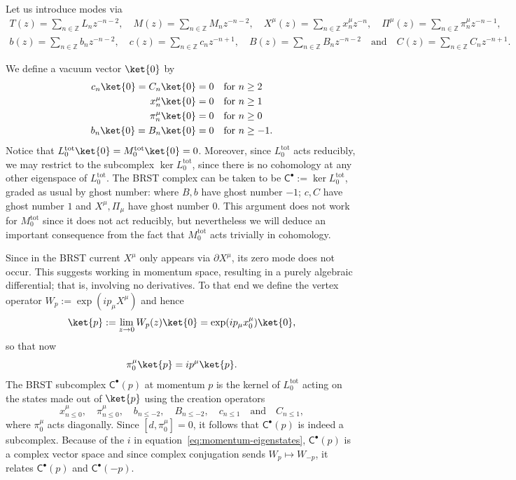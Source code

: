 \documentclass[11pt,reqno,a4paper,final]{amsart}
\theoremstyle{plain}
\theoremstyle{definition}
\renewcommand{\d}{\partial}
\newcommand{\sC}{\mathsf{C}}
\newcommand{\Ltot}{L^{\text{tot}}}
\newcommand{\Mtot}{M^{\text{tot}}}
\newcommand{\vac}{\ket{p}}
\newcommand{\ZZ}{\mathbb{Z}}
\newcommand{\1}{\mathbb{1}}
\numberwithin{equation}{section}
\begin{document}
Let us introduce modes via
\begin{multline}
  T(z) =\sum_{n \in \ZZ} L_n z^{-n-2},\quad M(z) = \sum_{n \in \ZZ}
  M_n z^{-n-2},\quad X^\mu(z) = \sum_{n\in \ZZ} x^\mu_n
  z^{-n},\quad \Pi^\mu(z) =\sum_{n\in \ZZ} \pi^\mu_n
  z^{-n-1},\\
  b(z) = \sum_{n\in \ZZ} b_n z^{-n-2}, \quad c(z) = \sum_{n\in \ZZ}
  c_n z^{-n+1}, \quad B(z) = \sum_{n\in \ZZ} B_n z^{-n-2}
  \quad\text{and}\quad C(z) = \sum_{n\in \ZZ} C_n z^{-n+1}.
\end{multline}

We define a vacuum vector $\ket{0}$ by
\begin{equation}
  \begin{split}
    c_n \ket{0} = C_n \ket{0} &= 0 \quad\text{for $n\geq 2$}\\
    x^\mu_n \ket{0} &= 0 \quad\text{for $n\geq 1$}\\
    \pi^\mu_n \ket{0} &= 0 \quad\text{for $n\geq 0$}\\
    b_n \ket{0} = B_n \ket{0} &= 0 \quad\text{for $n\geq -1$}.
  \end{split}
\end{equation}
Notice that $\Ltot_0 \ket{0} = \Mtot_0 \ket{0} = 0$.  Moreover, since
$\Ltot_0$ acts reducibly, we may restrict to the subcomplex $\ker
\Ltot_0$, since there is no cohomology at any other eigenspace of
$\Ltot_0$.  The BRST complex can be taken to be $\sC^\bullet := \ker
\Ltot_0$, graded as usual by ghost number: where $B,b$ have ghost
number $-1$; $c,C$ have ghost number $1$ and $X^\mu, \Pi_\mu$ have
ghost number $0$.  This argument does not work for $\Mtot_0$ since it
does not act reducibly, but nevertheless we will deduce an important
consequence from the fact that $\Mtot_0$ acts trivially in cohomology.

Since in the BRST current $X^\mu$ only appears via $\d X^\mu$, its
zero mode does not occur.  This suggests working in momentum space,
resulting in a purely algebraic differential; that is, involving no
derivatives.  To that end we define the vertex operator $W_p := \exp(i
p_\mu X^\mu)$ and hence
\begin{equation}
  \vac := \lim_{z\to 0} W_p(z) \ket{0} = \exp(i p_\mu x^\mu_0) \ket{0},
\end{equation}
so that now
\begin{equation}
  \label{eq:momentum-eigenstates}
  \pi^\mu_0 \vac = i p^\mu \vac.
\end{equation}
The BRST subcomplex $\sC^\bullet(p)$ at momentum $p$ is the kernel of
$\Ltot_0$ acting on the states made out of $\vac$ using the creation
operators
\begin{equation}
  x^\mu_{n\leq 0}, \quad   \pi^\mu_{n\leq 0}, \quad b_{n\leq -2},
  \quad B_{n\leq -2}, \quad c_{n\leq 1} \quad\text{and}\quad C_{n\leq
    1},
\end{equation}
where $\pi^\mu_0$ acts diagonally.  Since $[d,\pi^\mu_0]=0$,
it follows that $\sC^\bullet(p)$ is indeed
a subcomplex.  Because of the $i$ in
equation~\eqref{eq:momentum-eigenstates}, $\sC^\bullet(p)$ is a
complex vector space and since complex conjugation sends $W_p \mapsto
W_{-p}$, it relates $\sC^\bullet(p)$ and $\sC^\bullet(-p)$.
\end{document}
